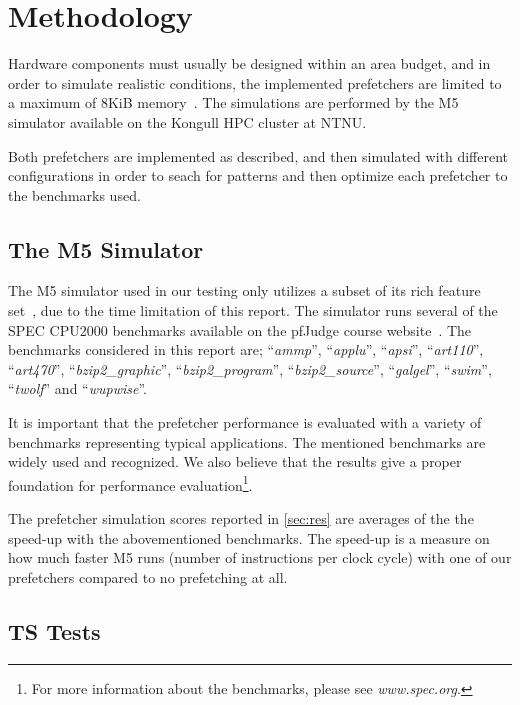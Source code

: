 \section{Methodology}

Hardware components must usually be designed within an area budget, and in order
to simulate realistic conditions, the implemented prefetchers are limited to a
maximum of 8KiB memory~\cite{guidelines}. The simulations are performed by the
M5 simulator available on the Kongull HPC cluster at NTNU.

Both prefetchers are implemented as described, and then simulated with different
configurations in order to seach for patterns and then optimize each prefetcher
to the benchmarks used.

\subsection{The M5 Simulator}
The M5 simulator used in our testing only utilizes a subset of its rich
feature set~\cite{user_doc}, due to the time limitation of this report. The simulator runs several of the SPEC CPU2000 benchmarks available on the
pfJudge course website~\cite{guidelines}. The benchmarks considered in this
report are; ``\emph{ammp}'', ``\emph{applu}'', ``\emph{apsi}'',
``\emph{art110}'', ``\emph{art470}'', ``\emph{bzip2\_graphic}'',
``\emph{bzip2\_program}'', ``\emph{bzip2\_source}'', ``\emph{galgel}'',
``\emph{swim}'', ``\emph{twolf}'' and ``\emph{wupwise}''.

It is important that the prefetcher performance is evaluated with a variety of
benchmarks representing typical applications. The mentioned benchmarks are
widely used and recognized. We also believe that the results give a proper
foundation for performance evaluation\footnote{For more information about the
benchmarks, please see \emph{www.spec.org}.}.

The prefetcher simulation scores reported in \ref{sec:res} are averages of the 
the speed-up with the abovementioned benchmarks. The speed-up is a measure on how
much faster M5 runs (number of instructions per clock cycle) with one of our 
prefetchers compared to no prefetching at all.


\subsection{TS Tests}

